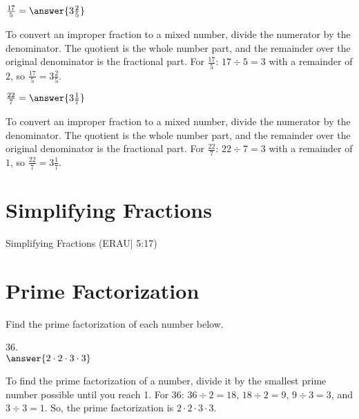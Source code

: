 \documentclass{ximera}
\begin{document}
\begin{problem}
$\frac{17}{5} = \answer{3\frac{2}{5}}$
\begin{feedback}
To convert an improper fraction to a mixed number, divide the numerator by the denominator. The quotient is the whole number part, and the remainder over the original denominator is the fractional part. For $\frac{17}{5}$: $17 \div 5 = 3$ with a remainder of $2$, so $\frac{17}{5} = 3\frac{2}{5}$.
\end{feedback}
\end{problem}

\begin{problem}
$\frac{22}{7} = \answer{3\frac{1}{7}}$
\begin{feedback}
To convert an improper fraction to a mixed number, divide the numerator by the denominator. The quotient is the whole number part, and the remainder over the original denominator is the fractional part. For $\frac{22}{7}$: $22 \div 7 = 3$ with a remainder of $1$, so $\frac{22}{7} = 3\frac{1}{7}$.
\end{feedback}
\end{problem}


\section*{Simplifying Fractions}

Simplifying Fractions (ERAU| 5:17)



\section*{Prime Factorization}

Find the prime factorization of each number below.

\begin{problem}
$36$.\\
$\answer{2 \cdot 2 \cdot 3 \cdot 3}$
\begin{feedback}
To find the prime factorization of a number, divide it by the smallest prime number possible until you reach 1. For $36$: $36 \div 2 = 18$, $18 \div 2 = 9$, $9 \div 3 = 3$, and $3 \div 3 = 1$. So, the prime factorization is $2 \cdot 2 \cdot 3 \cdot 3$.
\end{feedback}
\end{problem}
\end{document}
